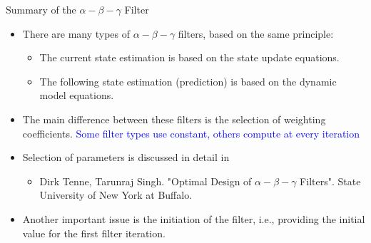 \begin{frame}{Summary of the $\alpha-\beta-\gamma$ Filter}

\begin{itemize}
    \item There are many types of $\alpha-\beta-\gamma$  filters, based on the same principle:
    \begin{itemize}
        \item The current state estimation is based on the state update equations.
        \item The following state estimation (prediction) is based on the dynamic model equations.
    \end{itemize}
    \item The main difference between these filters is the selection of weighting coefficients. \textcolor{blue}{Some filter types use constant, others compute at every iteration}
    \item Selection of parameters is discussed in detail in
        \begin{itemize}
            \item Dirk Tenne, Tarunraj Singh. "Optimal Design of $\alpha-\beta-\gamma$ Filters". State University of New York at Buffalo.
        \end{itemize}
    \item Another important issue is the initiation of the filter, i.e., providing the initial value for the first filter iteration.
\end{itemize}
    
\end{frame}


